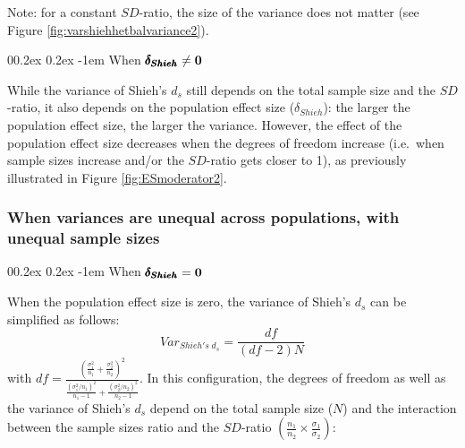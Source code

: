 \documentclass[
  english,
  man,mask]{apa6}
\makeatletter
\let\oldparagraph\paragraph
\renewcommand{\paragraph}[1]{\oldparagraph{#1}\mbox{}}
\renewcommand{\paragraph}{\@startsection{paragraph}{4}{\parindent}%
  {0\baselineskip \@plus 0.2ex \@minus 0.2ex}%
  {-1em}%
  {\normalfont\normalsize\bfseries\itshape\typesectitle}}
\makeatother
\begin{document}
Note: for a constant \(SD\)-ratio, the size of the variance does not matter (see Figure \ref{fig:varshiehhetbalvariance2}).

\hypertarget{when-bf-pmbdelta_shieh-neq-0-1}{%
\paragraph{\texorpdfstring{When \(\bf \pmb{\delta_{Shieh}} \neq 0\)}{When \textbackslash bf \textbackslash pmb\{\textbackslash delta\_\{Shieh\}\} \textbackslash neq 0}}\label{when-bf-pmbdelta_shieh-neq-0-1}}

While the variance of Shieh's \(d_s\) still depends on the total sample size and the \(SD\)-ratio, it also depends on the population effect size (\(\delta_{Shieh}\)): the larger the population effect size, the larger the variance. However, the effect of the population effect size decreases when the degrees of freedom increase (i.e.~when sample sizes increase and/or the \(SD\)-ratio gets closer to 1), as previously illustrated in Figure \ref{fig:ESmoderator2}.

\hypertarget{when-variances-are-unequal-across-populations-with-unequal-sample-sizes-2}{%
\subsubsection{When variances are unequal across populations, with unequal sample sizes}\label{when-variances-are-unequal-across-populations-with-unequal-sample-sizes-2}}

\hypertarget{when-bf-pmbdelta_shieh0-2}{%
\paragraph{\texorpdfstring{When \(\bf \pmb{\delta_{Shieh}}=0\)}{When \textbackslash bf \textbackslash pmb\{\textbackslash delta\_\{Shieh\}\}=0}}\label{when-bf-pmbdelta_shieh0-2}}

When the population effect size is zero, the variance of Shieh's \(d_s\) can be simplified as follows:
\[Var_{Shieh's \; d_s} = \frac{df}{(df-2)N}\]
with \(df = \frac{\left(\frac{\sigma^2_1}{n_1}+\frac{\sigma^2_2}{n_2} \right)^2}{\frac{(\sigma^2_1/n_1)^2}{n_1-1}+\frac{(\sigma^2_2/n_2)^2}{n_2-1}}\). In this configuration, the degrees of freedom as well as the variance of Shieh's \(d_s\) depend on the total sample size (\(N\)) and the interaction between the sample sizes ratio and the \(SD\)-ratio \(\left(\frac{n_1}{n_2}\times\frac{\sigma_1}{\sigma_2} \right)\):
\end{document}
